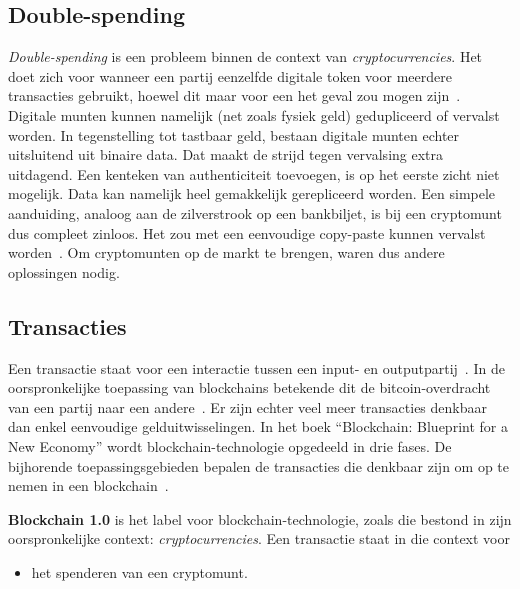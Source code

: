 \subsection{Double-spending}
\label{sub:double-spending}

\textit{Double-spending} is een probleem binnen de context van \textit{cryptocurrencies}. Het doet zich voor wanneer een partij eenzelfde digitale token voor meerdere transacties gebruikt, hoewel dit maar voor een het geval zou mogen zijn~\autocite{Chohan2021}. Digitale munten kunnen namelijk (net zoals fysiek geld) gedupliceerd of vervalst worden. In tegenstelling tot tastbaar geld, bestaan digitale munten echter uitsluitend uit binaire data. Dat maakt de strijd tegen vervalsing extra uitdagend. Een kenteken van authenticiteit toevoegen, is op het eerste zicht niet mogelijk. Data kan namelijk heel gemakkelijk gerepliceerd worden. Een simpele aanduiding, analoog aan de zilverstrook op een bankbiljet, is bij een cryptomunt dus compleet zinloos. Het zou met een eenvoudige copy-paste kunnen vervalst worden~\autocite{Hoepman2008}. Om cryptomunten op de markt te brengen, waren dus andere oplossingen nodig.


\subsection{Transacties}
\label{sub:transacties}

Een transactie staat voor een interactie tussen een input- en outputpartij~\autocite{Salem2008}. In de oorspronkelijke toepassing van blockchains betekende dit de bitcoin-overdracht van een partij naar een andere~\autocite{Pierro2017}. Er zijn echter veel meer transacties denkbaar dan enkel eenvoudige gelduitwisselingen.
In het boek ``Blockchain: Blueprint for a New Economy'' wordt blockchain-technologie opgedeeld in drie fases. De bijhorende toepassingsgebieden bepalen de transacties die denkbaar zijn om op te nemen in een blockchain~\autocite{Swan2015}.

\textbf{Blockchain 1.0} is het label voor blockchain-technologie, zoals die bestond in zijn oorspronkelijke context: \textit{cryptocurrencies}. Een transactie staat in die context voor
\begin{itemize}
	\item het spenderen van een cryptomunt.
\end{itemize}


